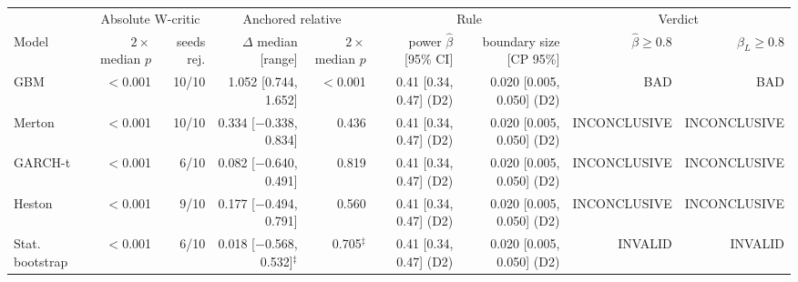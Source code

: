 \begin{tabular}{lrrrrrrrr}
\toprule
 & \multicolumn{2}{c}{Absolute W-critic} & \multicolumn{2}{c}{Anchored relative} & \multicolumn{2}{c}{Rule} & \multicolumn{2}{c}{Verdict} \\
\cmidrule(lr){2-3} \cmidrule(lr){4-5} \cmidrule(lr){6-7} \cmidrule(lr){8-9}
Model & $2\times$median $p$ & seeds rej. & $\Delta$ median [range] & $2\times$median $p$ & power $\hat\beta$ [95\% CI] & boundary size [CP 95\%] & $\hat\beta\ge0.8$ & $\beta_L\ge0.8$ \\
\midrule
GBM & $<$0.001 & 10/10 & 1.052 [0.744, 1.652] & $<$0.001 & 0.41 [0.34, 0.47] (D2) & 0.020 [0.005, 0.050] (D2) & BAD & BAD \\
Merton & $<$0.001 & 10/10 & 0.334 [$-$0.338, 0.834] & 0.436 & 0.41 [0.34, 0.47] (D2) & 0.020 [0.005, 0.050] (D2) & INCONCLUSIVE & INCONCLUSIVE \\
GARCH-t & $<$0.001 & 6/10 & 0.082 [$-$0.640, 0.491] & 0.819 & 0.41 [0.34, 0.47] (D2) & 0.020 [0.005, 0.050] (D2) & INCONCLUSIVE & INCONCLUSIVE \\
Heston & $<$0.001 & 9/10 & 0.177 [$-$0.494, 0.791] & 0.560 & 0.41 [0.34, 0.47] (D2) & 0.020 [0.005, 0.050] (D2) & INCONCLUSIVE & INCONCLUSIVE \\
Stat. bootstrap & $<$0.001 & 6/10 & 0.018 [$-$0.568, 0.532]$^{\ddagger}$ & 0.705$^{\ddagger}$ & 0.41 [0.34, 0.47] (D2) & 0.020 [0.005, 0.050] (D2) & INVALID & INVALID \\
\bottomrule
\end{tabular}
